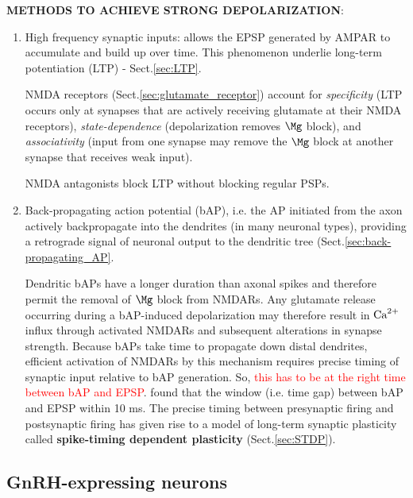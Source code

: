 {\bf METHODS TO ACHIEVE STRONG DEPOLARIZATION}:
\begin{enumerate}
  \item  High frequency synaptic inputs: allows the EPSP generated by AMPAR
  to accumulate and build up over time. This phenomenon underlie long-term
  potentiation (LTP) - Sect.\ref{sec:LTP}.

NMDA receptors (Sect.\ref{sec:glutamate_receptor}) account for {\it specificity}
(LTP occurs only at synapses that are actively receiving glutamate at their NMDA
receptors), {\it state-dependence} (depolarization removes $\Mg$ block), and
{\it associativity} (input from one synapse may remove the $\Mg$ block at
another synapse that receives weak input).

NMDA antagonists block LTP without blocking regular PSPs. 

  \item Back-propagating action potential (bAP), i.e. the AP initiated from the
  axon actively backpropagate into the dendrites (in many neuronal types),
  providing a retrograde signal of neuronal output to the dendritic tree
  \citep{stuart1997} (Sect.\ref{sec:back-propagating_AP}. 
  
  Dendritic bAPs have a longer duration than axonal spikes and therefore permit
  the removal of $\Mg$ block from NMDARs. Any glutamate release occurring during
  a bAP-induced depolarization may therefore result in ${\text{Ca}^{2+}}$ influx through
  activated NMDARs and subsequent alterations in synapse strength.
  Because bAPs take time to propagate down distal dendrites, efficient
  activation of NMDARs by this mechanism requires precise timing of synaptic
  input relative to bAP generation.
   So, \textcolor{red}{this has to be at the right time between bAP and
  EPSP}. \citep{markram1997} found that the window (i.e. time gap) between bAP
  and EPSP within 10 ms. The precise timing between presynaptic firing and
  postsynaptic firing has given rise to a model of long-term synaptic plasticity
  called {\bf spike-timing dependent plasticity} (Sect.\ref{sec:STDP}).
  
\end{enumerate}

\subsection{GnRH-expressing neurons}
\label{sec:GnRH-expressing-neurons}

